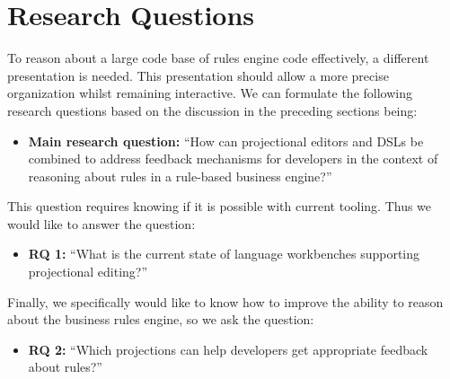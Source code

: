 \section{Research Questions}
\label{section:Research_Questions}

To reason about a large code base of rules engine code effectively, a different presentation is needed.
This presentation should allow a more precise organization whilst remaining interactive.
We can formulate the following research questions based on the discussion in the preceding sections being:

\begin{itemize}
    \setlength\itemsep{0em}
    \item \textbf{Main research question:} ``How can projectional editors and DSLs be combined to address feedback mechanisms for developers in the context of reasoning about rules in a rule-based business engine?''
\end{itemize}

This question requires knowing if it is possible with current tooling. Thus we would like to answer the question:
\begin{itemize}
    \setlength\itemsep{0em}
    \item \textbf{RQ 1:} ``What is the current state of language workbenches supporting projectional editing?''
\end{itemize}

Finally, we specifically would like to know how to improve the ability to reason about the business rules engine, so we ask the question:
\begin{itemize}
    \setlength\itemsep{0em}
    \item \textbf{RQ 2:} ``Which projections can help developers get appropriate feedback about rules?''
\end{itemize}
